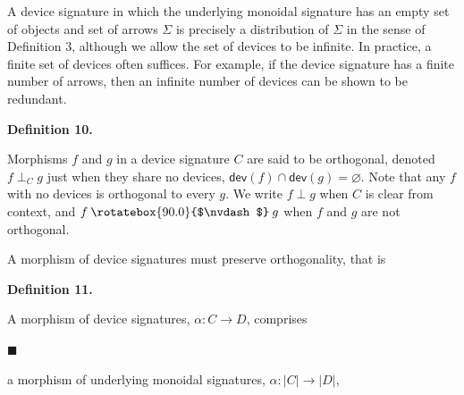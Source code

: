  
A device signature in which the underlying monoidal signature has an empty set of objects and set of arrows $\Sigma$ is precisely a distribution of $\Sigma$ in the sense of Definition 3, although we allow the set of devices to be infinite. In practice, a finite set of devices often suffices. For example, if the device signature has a finite number of arrows, then an infinite number of devices can be shown to be redundant.\par
 
 
 
 
\par\medskip\noindent\textbf{Definition 10.}\par
 
 
Morphisms $f$ and $g$ in a device signature $C$ are said to be orthogonal, denoted $f\perp_{C}g$ just when they share no devices, $\mathsf{dev}(f)\cap\mathsf{dev}(g)=\varnothing$. Note that any $f$ with no devices is orthogonal to every $g$. We write $f\perp g$ when $C$ is clear from context, and $f\mathbin{\rotatebox{90.0}{$\nvdash$}}g$ when $f$ and $g$ are not orthogonal.\par
 
 
 
 
A morphism of device signatures must preserve orthogonality, that is\par
 
 
 
\par\medskip\noindent\textbf{Definition 11.}\par
 
 
A morphism of device signatures, $\alpha:C\to D$, comprises\par
  
\par\noindent  $\blacksquare$ 
 
a morphism of underlying monoidal signatures, $\alpha:|C|\to|D|$,\par
 
 
